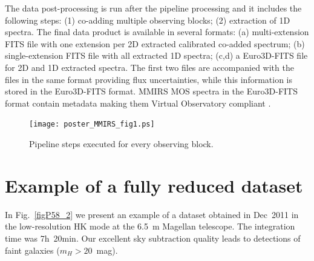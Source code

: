 \documentclass[11pt,twoside]{article}
\begin{document}
The data post-processing is run after the pipeline processing and it
includes the following steps: (1) co-adding multiple observing blocks; (2)
extraction of 1D spectra.  The final data product is available in several
formats: (a) multi-extension FITS file with one extension per 2D extracted
calibrated co-added spectrum; (b) single-extension FITS file with all
extracted 1D spectra; (c,d) a Euro3D-FITS file for 2D and 1D extracted
spectra.  The first two files are accompanied with the files in the same
format providing flux uncertainties, while this information is stored in the
Euro3D-FITS format.  MMIRS MOS spectra in the Euro3D-FITS format contain
metadata making them Virtual Observatory compliant
\citep{CBLM06,Chilingarian+08b}.

\begin{figure}
\texttt{[image: poster\_MMIRS\_fig1.ps]}
\caption{Pipeline steps executed for every observing block.\label{figP58_1}}
\end{figure}

\section{Example of a fully reduced dataset}

In Fig.~\ref{figP58_2} we present an example of a dataset obtained in
Dec~2011 in the low-resolution HK mode at the 6.5~m Magellan telescope. The
integration time was 7h~20min. Our excellent sky subtraction quality
leads to detections of faint galaxies ($m_H>20$~mag).
\end{document}

